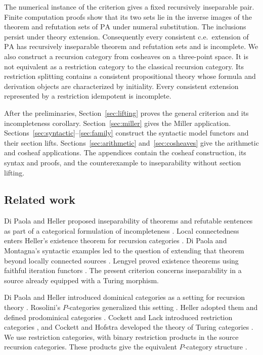 \documentclass[11pt]{article}
\newcommand{\PA}{\mathrm{PA}}
\begin{document}
The numerical instance of the criterion gives a fixed recursively
inseparable pair. Finite computation proofs show that its two sets lie
in the inverse images of the theorem and refutation sets of $\PA$ under
numeral substitution. The inclusions persist under theory extension.
Consequently every consistent c.e.\ extension of $\PA$ has recursively
inseparable theorem and refutation sets and is incomplete.
We also construct a recursion category from cosheaves on a three-point
space. It is not equivalent as a restriction category to the classical
recursion category. Its restriction splitting contains a consistent
propositional theory whose formula and derivation objects are
characterized by initiality. Every consistent extension represented
by a restriction idempotent is incomplete.

After the preliminaries, Section~\ref{sec:lifting} proves the general
criterion and its incompleteness corollary.
Section~\ref{sec:miller} gives the Miller application.
Sections~\ref{sec:syntactic}--\ref{sec:family} construct the syntactic
model functors and their section lifts. Sections~\ref{sec:arithmetic}
and~\ref{sec:cosheaves} give the arithmetic and cosheaf applications.
The appendices contain the cosheaf construction, its syntax and proofs,
and the counterexample to inseparability without section lifting.

\subsection{Related work}

Di Paola and Heller proposed inseparability of theorems and refutable
sentences as part of a categorical formulation of incompleteness
\cite[pp.~594--595]{DPH}. Local connectedness enters Heller's existence
theorem for recursion categories \cite[Sections 8--9]{Heller}.
Di Paola and Montagna's syntactic examples led to the question of
extending that theorem beyond locally connected sources \cite{DPM}.
Lengyel proved existence theorems using faithful iteration functors
\cite{Lengyel2004,Corrections}. The present criterion concerns
inseparability in a source already equipped with a Turing morphism.

Di Paola and Heller introduced dominical categories as a setting for
recursion theory \cite{DPH}. Rosolini's $P$-categories generalized this
setting \cite{RosoliniThesis,Rosolini}. Heller adopted them and defined
prodominical categories \cite[Section 5]{Heller}.
Cockett and Lack introduced restriction categories \cite{CockettLack},
and Cockett and Hofstra developed the theory of Turing categories
\cite{CockettHofstra}. We use restriction categories, with binary
restriction products in the source recursion categories. These products
give the equivalent $P$-category structure
\cite[Proposition 4.5]{CockettLackIII}.
\end{document}
